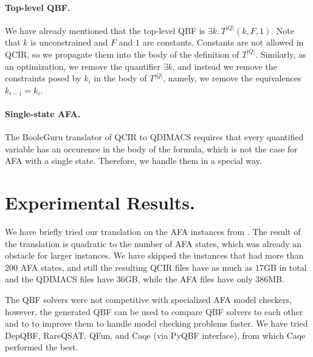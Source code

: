 \documentclass{article}
\begin{document}
\paragraph{Top-level QBF.}
We have already mentioned that the top-level QBF is $\exists k.~ T^{|Q|}(k, F, 1)$.
Note that $k$ is unconstrained and $F$ and $1$ are constants.
Constants are not allowed in QCIR, so we propagate them into the body of the definition of $T^{|Q|}$.
Similarly, as an optimization, we remove the quantifier $\exists k$, and instead we remove the constraints posed by $k_i$ in the body of $T^{|Q|}$, namely, we remove the equivalences $k_{i-1} = k_i$.

\paragraph{Single-state AFA.}
The BooleGuru translator of QCIR to QDIMACS requires that every quantified variable has an occurence in the body of the formula, which is not the case for AFA with a single state.
Therefore, we handle them in a special way.

\section{Experimental Results.}
We have briefly tried our translation on the AFA instances from \cite{antisat}.
The result of the translation is quadratic to the number of AFA states, which was already an obstacle for larger instances.
We have skipped the instances that had more than 200 AFA states, and still the resulting QCIR files have as much as 17GB in total and the QDIMACS files have 36GB, while the AFA files have only 386MB.

The QBF solvers were not competitive with specialized AFA model checkers, however, the generated QBF can be used to compare QBF solvers to each other and to to improve them to handle model checking problems faster.
We have tried DepQBF, RareQSAT, QFun, and Caqe (via PyQBF interface), from which Caqe performed the best.



\end{document}
